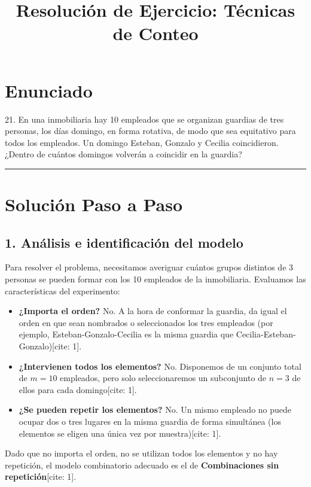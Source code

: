 \documentclass[12pt, a4paper]{article}
\title{Resolución de Ejercicio: Técnicas de Conteo}
\author{}
\date{}
\begin{document}
\maketitle

\section*{Enunciado}
21. En una inmobiliaria hay 10 empleados que se organizan guardias de tres personas, los días domingo, en forma rotativa, de modo que sea equitativo para todos los empleados. Un domingo Esteban, Gonzalo y Cecilia coincidieron. ¿Dentro de cuántos domingos volverán a coincidir en la guardia?

\vspace{0.5cm}
\hrule
\vspace{0.5cm}

\section*{Solución Paso a Paso}

\subsection*{1. Análisis e identificación del modelo}
Para resolver el problema, necesitamos averiguar cuántos grupos distintos de 3 personas se pueden formar con los 10 empleados de la inmobiliaria. Evaluamos las características del experimento:
\begin{itemize}[label=\checkmark]
    \item \textbf{¿Importa el orden?} No. A la hora de conformar la guardia, da igual el orden en que sean nombrados o seleccionados los tres empleados (por ejemplo, Esteban-Gonzalo-Cecilia es la misma guardia que Cecilia-Esteban-Gonzalo)[cite: 1].
    \item \textbf{¿Intervienen todos los elementos?} No. Disponemos de un conjunto total de $m=10$ empleados, pero solo seleccionaremos un subconjunto de $n=3$ de ellos para cada domingo[cite: 1].
    \item \textbf{¿Se pueden repetir los elementos?} No. Un mismo empleado no puede ocupar dos o tres lugares en la misma guardia de forma simultánea (los elementos se eligen una única vez por muestra)[cite: 1].
\end{itemize}

Dado que no importa el orden, no se utilizan todos los elementos y no hay repetición, el modelo combinatorio adecuado es el de \textbf{Combinaciones sin repetición}[cite: 1].
\end{document}
